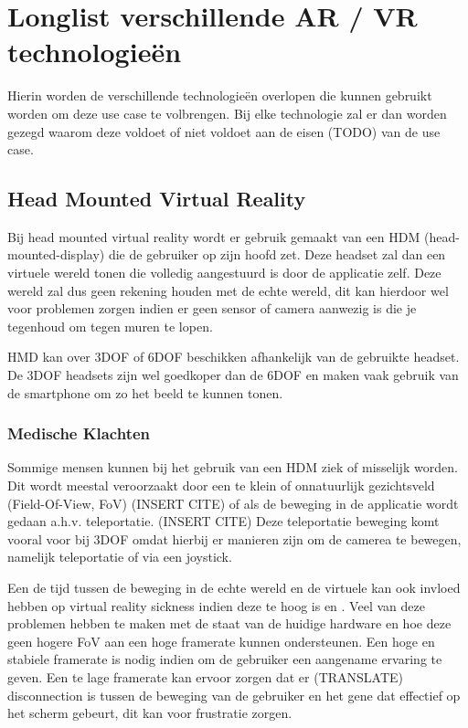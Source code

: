 \chapter{Longlist verschillende AR / VR technologieën}
\label{ch:longlist}

Hierin worden de verschillende technologieën overlopen die kunnen gebruikt worden om deze use case te volbrengen.
Bij elke technologie zal er dan worden gezegd waarom deze voldoet of niet voldoet aan de eisen (TODO) van de use case.

\section{Head Mounted Virtual Reality}
Bij head mounted virtual reality wordt er gebruik gemaakt van een HDM (head-mounted-display) die de gebruiker op zijn hoofd zet. Deze headset zal dan een virtuele wereld tonen die volledig aangestuurd is door de applicatie zelf. Deze wereld zal dus geen rekening houden met de echte wereld, dit kan hierdoor wel voor problemen zorgen indien er geen sensor of camera aanwezig is die je tegenhoud om tegen muren te lopen.

HMD kan over 3DOF of 6DOF beschikken afhankelijk van de gebruikte headset. De 3DOF headsets zijn wel goedkoper dan de 6DOF en maken vaak gebruik van de smartphone om zo het beeld te kunnen tonen. 
\subsection{Medische Klachten}
Sommige mensen kunnen bij het gebruik van een HDM ziek of misselijk worden. Dit wordt meestal veroorzaakt door een te klein of onnatuurlijk gezichtsveld (Field-Of-View, FoV) (INSERT CITE) of als de beweging in de applicatie wordt gedaan a.h.v. teleportatie. (INSERT CITE) Deze teleportatie beweging komt vooral voor bij 3DOF omdat hierbij er manieren zijn om de camerea te bewegen, namelijk teleportatie of via een joystick.

Een de tijd tussen de beweging in de echte wereld en de virtuele kan ook invloed hebben op virtual reality sickness indien deze te hoog is \autocite{Elbamby2018} en \autocite{DiZio2000}.
Veel van deze problemen hebben te maken met de staat van de huidige hardware en hoe deze geen hogere FoV aan een hoge framerate kunnen ondersteunen. Een hoge en stabiele framerate is nodig indien om de gebruiker een aangename ervaring te geven. Een te lage framerate kan ervoor zorgen dat er (TRANSLATE) disconnection is tussen de beweging van de gebruiker en het gene dat effectief op het scherm gebeurt, dit kan voor frustratie zorgen.
